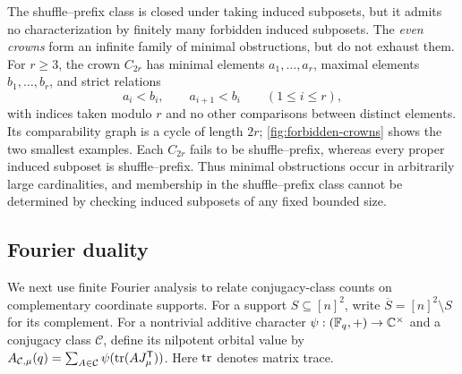 {The shuffle--prefix class is closed under taking induced
subposets, but it admits no characterization by finitely many forbidden
induced subposets. The \emph{even crowns} form an infinite family of minimal
obstructions, but do not exhaust them. For $r\geq3$, the crown $C_{2r}$ has minimal
elements $a_1,\ldots,a_r$, maximal elements $b_1,\ldots,b_r$, and strict
relations
\[
 a_i<b_i,\qquad a_{i+1}<b_i\qquad(1\leq i\leq r),
\]
with indices taken modulo $r$ and no other comparisons between distinct
elements. Its comparability graph is a cycle of length $2r$;
\cref{fig:forbidden-crowns} shows the two smallest examples.
Each $C_{2r}$ fails to be shuffle--prefix, whereas every proper induced
subposet is shuffle--prefix. Thus minimal obstructions occur in arbitrarily
large cardinalities, and membership in the shuffle--prefix class cannot be
determined by checking induced subposets of any fixed bounded size.}


\FloatBarrier

\subsection{Fourier duality}

{We next use finite Fourier analysis to relate
conjugacy-class counts on complementary coordinate supports.
For a support $S\subseteq[n]^2$, write
$\overline S=[n]^2\setminus S$ for its complement.}
For a nontrivial additive character $\psi:(\mathbb F_q,+)\to\mathbb C^\times$
and a {conjugacy class} $\mathcal C$, define its nilpotent orbital value by
$A_{\mathcal C,\mu}(q)=\sum_{A\in\mathcal C}\psi(\operatorname{tr}(AJ_\mu^{\mathsf T}))$.
Here $\operatorname{tr}$ denotes matrix trace.

